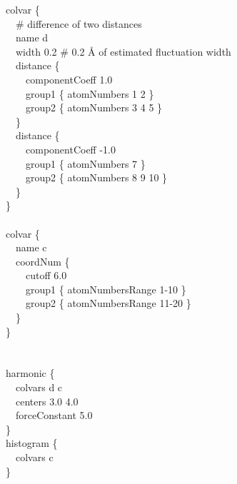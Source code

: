 {%
\noindent\ttfamily
colvar \{\\
\-~~\# difference of two distances\\
\-~~name d \\
\-~~width 0.2  \# 0.2 \AA{} of estimated fluctuation width \\
\-~~distance \{\\
\-~~~~componentCoeff  1.0\\
\-~~~~group1 \{ atomNumbers 1 2 \}\\
\-~~~~group2 \{ atomNumbers 3 4 5 \}\\
\-~~\}\\
\-~~distance \{\\
\-~~~~componentCoeff -1.0\\
\-~~~~group1 \{ atomNumbers 7 \}\\
\-~~~~group2 \{ atomNumbers 8 9 10 \}\\
\-~~\}\\
\}\\
\\
colvar \{\\
\-~~name c\\
\-~~coordNum \{\\
\-~~~~cutoff 6.0\\
\-~~~~group1 \{ atomNumbersRange  1-10 \}\\
\-~~~~group2 \{ atomNumbersRange 11-20 \}\\
\-~~\}\\
\}\\}
{%
\noindent\ttfamily\\
\\
harmonic \{\\
\-~~colvars d c\\
\-~~centers 3.0 4.0\\
\-~~forceConstant 5.0\\
\}\\

\noindent histogram \{\\
\-~~colvars c\\
\}\\}

